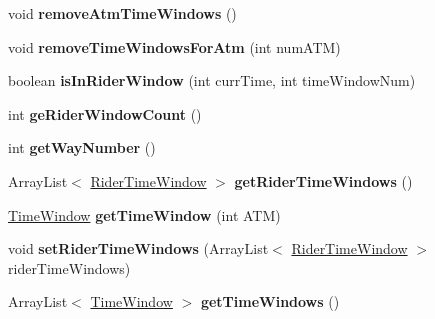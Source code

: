 \begin{DoxyCompactItemize}
\item 
void {\bfseries remove\+Atm\+Time\+Windows} ()\hypertarget{classheneticmethod_1_1_matrix_a093570fe1b632c6302318d226e81b2ac}{}\label{classheneticmethod_1_1_matrix_a093570fe1b632c6302318d226e81b2ac}

\item 
void {\bfseries remove\+Time\+Windows\+For\+Atm} (int num\+A\+TM)\hypertarget{classheneticmethod_1_1_matrix_a7a771067275f581a8edea47930bfb74f}{}\label{classheneticmethod_1_1_matrix_a7a771067275f581a8edea47930bfb74f}

\item 
boolean {\bfseries is\+In\+Rider\+Window} (int curr\+Time, int time\+Window\+Num)\hypertarget{classheneticmethod_1_1_matrix_a0b9111fdaece548af6cf2450604e77bf}{}\label{classheneticmethod_1_1_matrix_a0b9111fdaece548af6cf2450604e77bf}

\item 
int {\bfseries ge\+Rider\+Window\+Count} ()\hypertarget{classheneticmethod_1_1_matrix_a9b227e55bfd7fd55282e1db3a4163a29}{}\label{classheneticmethod_1_1_matrix_a9b227e55bfd7fd55282e1db3a4163a29}

\item 
int {\bfseries get\+Way\+Number} ()\hypertarget{classheneticmethod_1_1_matrix_a90f373564c2f2e132df2a44942b973cd}{}\label{classheneticmethod_1_1_matrix_a90f373564c2f2e132df2a44942b973cd}

\item 
Array\+List$<$ \hyperlink{classheneticmethod_1_1_rider_time_window}{Rider\+Time\+Window} $>$ {\bfseries get\+Rider\+Time\+Windows} ()\hypertarget{classheneticmethod_1_1_matrix_a815628be73b8074a260bef43dadf2a61}{}\label{classheneticmethod_1_1_matrix_a815628be73b8074a260bef43dadf2a61}

\item 
\hyperlink{classheneticmethod_1_1_time_window}{Time\+Window} {\bfseries get\+Time\+Window} (int A\+TM)\hypertarget{classheneticmethod_1_1_matrix_a579876a3a311476c35ceb9189360321f}{}\label{classheneticmethod_1_1_matrix_a579876a3a311476c35ceb9189360321f}

\item 
void {\bfseries set\+Rider\+Time\+Windows} (Array\+List$<$ \hyperlink{classheneticmethod_1_1_rider_time_window}{Rider\+Time\+Window} $>$ rider\+Time\+Windows)\hypertarget{classheneticmethod_1_1_matrix_a0129e6b1197058d764c30507d0778d4d}{}\label{classheneticmethod_1_1_matrix_a0129e6b1197058d764c30507d0778d4d}

\item 
Array\+List$<$ \hyperlink{classheneticmethod_1_1_time_window}{Time\+Window} $>$ {\bfseries get\+Time\+Windows} ()\hypertarget{classheneticmethod_1_1_matrix_a913da5f89736352e9fd7a26b09ea62ec}{}\label{classheneticmethod_1_1_matrix_a913da5f89736352e9fd7a26b09ea62ec}


\end{DoxyCompactItemize}
